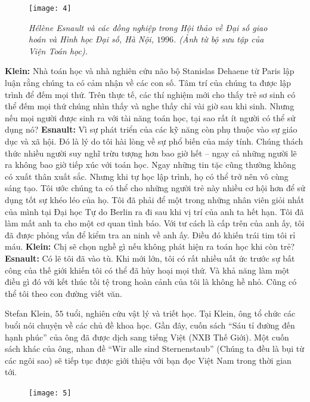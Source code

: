 \begin{multicols}{2}
\begin{figure}[H]
		\captionsetup{labelformat= empty, justification=centering}
		\texttt{[image: 4]}
		\caption{\small\textit{\color{doithoaitoanhoc}Hélène Esnault và các đồng nghiệp trong Hội thảo về Đại số giao hoán và Hình học Đại số, Hà Nội, $1996$. (Ảnh từ bộ sưu tập của Viện Toán học).}}
		\vspace*{-10pt}
	\end{figure}
	\textbf{\color{doithoaitoanhoc}Klein:} Nhà toán học và nhà nghiên cứu não bộ Stanislas Dehaene từ Paris lập luận rằng chúng ta có cảm nhận về các con số. Tâm trí của chúng ta được lập trình để đếm mọi thứ. Trên thực tế, các thí nghiệm mới cho thấy trẻ sơ sinh có thể đếm mọi thứ chúng nhìn thấy và nghe thấy chỉ vài giờ sau khi sinh. Nhưng nếu mọi người được sinh ra với tài năng toán học, tại sao rất ít người có thể sử dụng nó?
	\vskip 0.1cm
	\textbf{\color{doithoaitoanhoc}Esnault:} Vì sự phát triển của các kỹ năng còn phụ thuộc vào sự giáo dục và xã hội. Đó là lý do tôi hài lòng về sự phổ biến của máy \linebreak tính. Chúng thách thức nhiều người suy nghĩ trừu tượng hơn bao giờ hết -- ngay cả những người lẽ ra không bao giờ tiếp xúc với toán học. Ngay những tin tặc cũng thường không có xuất thân xuất sắc. Nhưng khi tự học lập trình, họ có thể trở nên vô cùng sáng tạo. Tôi ước chúng ta có thể cho những người trẻ này nhiều cơ hội hơn để sử dụng tốt sự khéo léo của họ. Tôi đã phải để một trong những nhân viên giỏi nhất của mình tại Đại học Tự do Berlin ra đi sau khi vị trí của anh ta hết hạn. Tôi đã làm mất anh ta cho một cơ quan tình báo. Với tư cách là cấp trên của anh ấy, tôi đã được phỏng vấn để kiểm tra an ninh về anh ấy. Điều đó khiến trái tim tôi rỉ máu.
	\vskip 0.1cm
	\textbf{\color{doithoaitoanhoc}Klein:} Chị sẽ chọn nghề gì nếu không phát hiện ra toán học khi còn trẻ?
	\vskip 0.1cm
	\textbf{\color{doithoaitoanhoc}Esnault:} Có lẽ tôi đã vào tù. Khi mới lớn, tôi có rất nhiều uất ức trước sự bất công của thế giới khiến tôi có thể đã hủy hoại mọi thứ. Và khả năng làm một điều gì đó với kết thúc tồi tệ trong hoàn cảnh của tôi là không hề nhỏ. Cũng có thể tôi theo con đường viết văn.
	\vskip 0.1cm
	\begin{tBox}
		Stefan Klein, $55$ tuổi, nghiên cứu vật lý và triết học. Tại Klein, ông tổ chức các buổi nói chuyện về các chủ đề khoa học. Gần đây, cuốn sách ``Sáu tỉ đường đến hạnh phúc” của ông đã được dịch sang tiếng Việt (NXB Thế Giới). Một cuốn sách khác của ông, nhan đề ``Wir alle sind Sternenstaub” (Chúng ta đều là bụi từ các ngôi sao) sẽ tiếp tục được giới thiệu với bạn đọc Việt Nam trong thời gian tới. 
		\begin{figure}[H]
			\centering
			\vspace*{-5pt}
			\captionsetup{labelformat= empty, justification=centering}
			\texttt{[image: 5]}
		\end{figure}
	\end{tBox}
\end{multicols}
